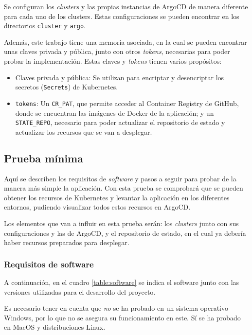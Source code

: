 Se configuran los \textit{clusters} y las propias instancias de ArgoCD de manera diferente para cada uno de los clusters. Estas configuraciones se pueden encontrar en los directorios \texttt{cluster} y \texttt{argo}.

Además, este trabajo tiene una memoria asociada, en la cual se pueden encontrar unas claves privada y pública, junto con otros \textit{tokens}, necesarias para poder probar la implementación. Estas claves y \textit{tokens} tienen varios propósitos:

\begin{itemize}
  \item Claves privada y pública: Se utilizan para encriptar y desencriptar los secretos (\texttt{Secrets}) de Kubernetes.
  \item \texttt{tokens}: Un \texttt{CR\_PAT}, que permite acceder al Container Registry de GitHub, donde se encuentran las imágenes de Docker de la aplicación; y un \texttt{STATE\_REPO}, necesario para poder actualizar el repositorio de estado y actualizar los recursos que se van a desplegar.
\end{itemize}

\subsection*{Prueba mínima}

Aquí se describen los requisitos de \textit{software} y pasos a seguir para probar de la manera más simple la aplicación. Con esta prueba se comprobará que se pueden obtener los recursos de Kubernetes y levantar la aplicación en los diferentes entornos, pudiendo visualizar todos estos recursos en ArgoCD.

Los elementos que van a influir en esta prueba serán: los \textit{clusters} junto con sus configuraciones y las de ArgoCD, y el repositorio de estado, en el cual ya debería haber recursos preparados para desplegar.

\subsubsection*{Requisitos de software}

A continuación, en el cuadro \ref{table:software} se indica el software junto con las versiones utilizadas para el desarrollo del proyecto.

Es necesario tener en cuenta que \textit{no} se ha probado en un sistema operativo Windows, por lo que no se asegura su funcionamiento en este. Sí se ha probado en MacOS y distribuciones Linux.

